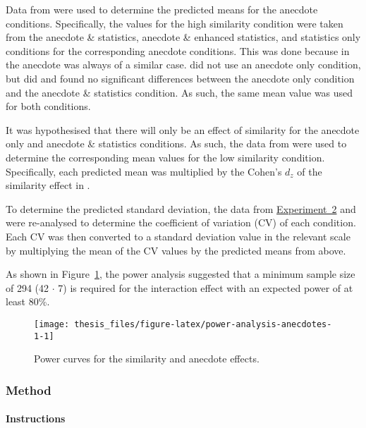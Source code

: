 \documentclass[a4paper, nobind]{templates/ociamthesis}
\theoremstyle{definition}
\theoremstyle{definition}
\theoremstyle{definition}
\theoremstyle{definition}
\theoremstyle{remark}
\begin{document}
Data from \textcite{wainberg2018} were used to determine the predicted means for the
anecdote conditions. Specifically, the values for the high similarity condition
were taken from the anecdote \& statistics, anecdote \& enhanced statistics, and
statistics only conditions for the corresponding anecdote conditions. This was
done because in \textcite{wainberg2018} the anecdote was always of a similar case.
\textcite{wainberg2018} did not use an anecdote only condition, but \textcite{wainberg2013} did and
found no significant differences between the anecdote only condition and the
anecdote \& statistics condition. As such, the same mean value was used for both
conditions.

It was hypothesised that there will only be an effect of similarity for the
anecdote only and anecdote \& statistics conditions. As such, the data from
\textcite[Study~3]{hoeken2009} were used to determine the corresponding mean values for
the low similarity condition. Specifically, each predicted mean was multiplied
by the Cohen's \(d_z\) of the similarity effect in \textcite[Study~3]{hoeken2009}.

To determine the predicted standard deviation, the data from \textcite{jaramillo2019} \protect\hyperlink{anecdotes-2-appendix}{Experiment~2} and \textcite[Study~3]{hoeken2009} were re-analysed to determine the
coefficient of variation (CV) of each condition. Each CV was then converted to a
standard deviation value in the relevant scale by multiplying the mean of the CV
values by the predicted means from above.

As shown in Figure~\ref{fig:power-analysis-anecdotes-1}, the power analysis
suggested that a minimum sample size of 294
(42 \(\cdot\) 7) is required for the interaction effect with
an expected power of at least 80\%.



\begin{figure}
\texttt{[image: thesis\_files/figure-latex/power-analysis-anecdotes-1-1]} \caption{Power curves for the similarity and anecdote effects.}\label{fig:power-analysis-anecdotes-1}
\end{figure}

\subsubsection{Method}

\hypertarget{instructions-materials-anecdotes-1-appendix}{%
\paragraph{Instructions}\label{instructions-materials-anecdotes-1-appendix}}
\end{document}
